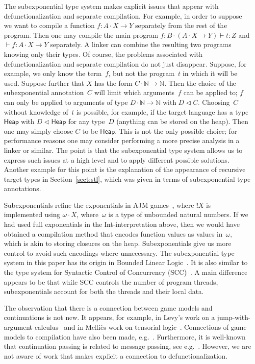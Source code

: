 \documentclass{LMCS}
\theoremstyle{definition}
\theoremstyle{plain}
\newcommand{\lolli}[3]{#1\cdot #2 \to #3}
\newcommand{\kw}[1]{\mathsf{#1}}
\newcommand{\NN}{\mathbb{N}}
\newcommand{\J}[3]{#1 \colon #2 \cdot #3}
\newcommand{\SeqTm}[3]{#1 \vdash #2 \colon #3}
\begin{document}
The subexponential type system makes explicit issues 
that appear with defunctionalization and separate compilation. 
For example, in order to suppose we want to compile a function $f\colon \lolli A X Y$
separately from the rest of the program. Then one may compile
the main program $\SeqTm{\J f B {(\lolli A X Y)}}{t}{Z}$ 
and $\SeqTm{}{f}{\lolli A X Y}$ separately. A linker can combine the
resulting two programs knowing only their types.
Of course, the problems associated with defunctionalization and separate
compilation do not just disappear. 
Suppose, for example, we only know the term~$f$, but not the
program~$t$ in which it will be used.
Suppose further that $X$ has the form $\lolli C \NN \NN$. Then 
the choice of the subexponential annotation~$C$ will limit 
which arguments~$f$ can be applied to; $f$ can only be applied to arguments
of type $\lolli D \NN \NN$ with $D \lhd C$. Choosing~$C$ without
knowledge of~$t$ is possible, for example, if 
the target language has a type $\kw{Heap}$ 
with $D\lhd \kw{Heap}$ for any type~$D$ (anything can be stored on the
heap). Then one may simply choose $C$ to be $\kw{Heap}$. 
This is not the only possible choice; for performance reasons
one may consider performing a more precise analysis in a linker or similar.
The point is that the subexponential type system allows us to express
such issues at a high level and to apply different possible solutions.
Another example for this point is the explanation of the appearance
of recursive target types in Section~\ref{sect:stl},
which was given in terms of subexponential type annotations.

Subexponentials refine the exponentials in AJM
games~\cite{AbramskyJM00}, where $!X$ is implemented using
$\omega\cdot X$, where~$\omega$ is a type of unbounded natural numbers.
If we had used full exponentials in the Int-interpretation 
above, then we would have obtained a compilation method that encodes
function values as values in~$\omega$, which is akin to storing closures on the
heap. Subexponentials give us more control to avoid such encodings where
unnecessary.
The subexponential type system in this paper has
its origin in Bounded Linear Logic~\cite{girardscedrovscott,Schopp07}.
It is also similar
to the type system for Syntactic Control of Concurrency (SCC)~\cite{DBLP:journals/tcs/GhicaMO06}.
A main
difference appears to be that while SCC controls
the number of program threads,
subexponentials account for both
the threads and their local data.

The observation that there is a connection between 
game models and continuations is not new. It appears, for example,
in Levy's work on a jump-with-argument calculus~\cite{cbpv}
and in Melli{\`e}s work on tensorial logic~\cite{mellies12}.
Connections of game models to compilation have also been made, e.g.~\cite{mellies}.
Furthermore, it is well-known that continuation passing is related to 
message passing, see e.g.~\cite{thieleckePhd}.
However, we 
are not aware of work that makes explicit a connection to defunctionalization.
\end{document}
